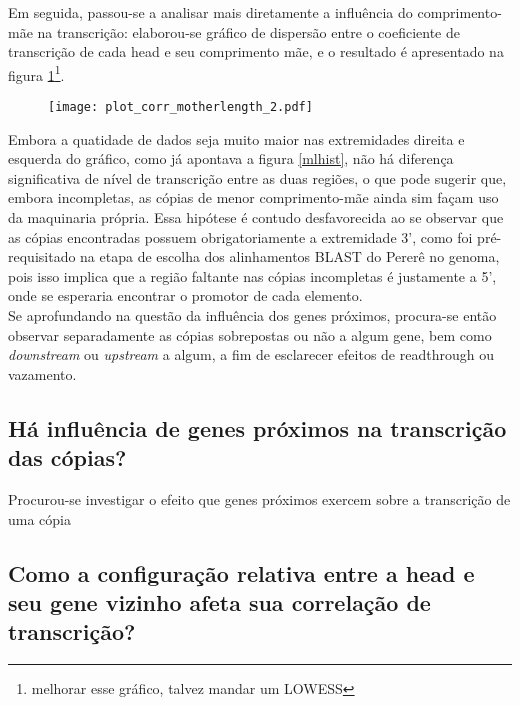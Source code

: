 \documentclass[12pt]{article}
\begin{document}
\begin{multicols}{2}
	Em seguida, passou-se a analisar mais diretamente a influência do comprimento-mãe na transcrição: elaborou-se gráfico de dispersão entre o coeficiente de transcrição de cada head e seu comprimento mãe, e o resultado é apresentado na figura \ref{mlrc}\footnote{melhorar esse gráfico, talvez mandar um LOWESS}.

\begin{figure}[H]
	\centering
	\label{mlrc}
	\texttt{[image: plot\_corr\_motherlength\_2.pdf]}
\end{figure}

Embora a quatidade de dados seja muito maior nas extremidades direita e esquerda do gráfico, como já apontava a figura \ref{mlhist}, não há diferença significativa de nível de transcrição entre as duas regiões, o que pode sugerir que, embora incompletas, as cópias de menor comprimento-mãe ainda sim façam uso da maquinaria própria. Essa hipótese é contudo desfavorecida ao se observar que as cópias encontradas possuem obrigatoriamente a extremidade 3', como foi pré-requisitado na etapa de escolha dos alinhamentos BLAST do Pererê no genoma, pois isso implica que a região faltante nas cópias incompletas é justamente a 5', onde se esperaria encontrar o promotor de cada elemento.\\

Se aprofundando na questão da influência dos genes próximos, procura-se então observar separadamente as cópias sobrepostas ou não a algum gene, bem como \textit{downstream} ou \textit{upstream} a algum, a fim de esclarecer efeitos de readthrough ou vazamento.


\subsection{Há influência de genes próximos na transcrição das cópias?}
Procurou-se investigar o efeito que genes próximos exercem sobre a transcrição de uma cópia


\subsection{Como a configuração relativa entre a head e seu gene vizinho afeta sua correlação de transcrição?}


\end{multicols}
\end{document}

